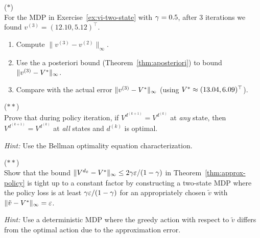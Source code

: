 \documentclass[11pt,a4paper]{article}
\begin{document}
\begin{exercise}
\textnormal{(\(*\))} \\
For the MDP in Exercise~\ref{ex:vi-two-state} with $\gamma = 0.5$,
after 3 iterations we found $v^{(3)} = (12.10, 5.12)^\top$.
\begin{enumerate}[label=(\alph*)]
    \item Compute $\|v^{(3)} - v^{(2)}\|_\infty$.
    \item Use the a posteriori bound
    (Theorem~\ref{thm:aposteriori}) to bound
    $\|v^{(3)} - V^*\|_\infty$.
    \item Compare with the actual error
    $\|v^{(3)} - V^*\|_\infty$ (using
    $V^* \approx (13.04, 6.09)^\top$).
\end{enumerate}
\end{exercise}

\begin{exercise}
\textnormal{(\(**\))} \\
Prove that during policy iteration, if $V^{d^{(k+1)}} = V^{d^{(k)}}$
at \emph{any} state, then $V^{d^{(k+1)}} = V^{d^{(k)}}$ at
\emph{all} states and $d^{(k)}$ is optimal.

\textit{Hint:} Use the Bellman optimality equation characterization.
\end{exercise}

\begin{exercise}
\textnormal{(\(**\))} \\
Show that the bound $\|V^{d_{\tilde{v}}} - V^*\|_\infty \leq
2\gamma\varepsilon/(1-\gamma)$ in
Theorem~\ref{thm:approx-policy} is tight up to a constant factor by
constructing a two-state MDP where the policy loss is at least
$\gamma\varepsilon/(1-\gamma)$ for an appropriately chosen
$\tilde{v}$ with $\|\tilde{v} - V^*\|_\infty = \varepsilon$.

\textit{Hint:} Use a deterministic MDP where the greedy action
with respect to $\tilde{v}$ differs from the optimal action due to
the approximation error.
\end{exercise}
\end{document}
